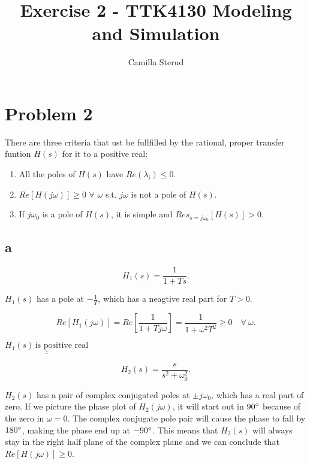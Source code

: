 \documentclass{article}
\title{Exercise 2 - TTK4130 Modeling and Simulation}
\author{Camilla Sterud}
\date{}
\begin{document}
\maketitle

\newpage

\section*{Problem 2}

There are three criteria that ust be fullfilled by the rational, proper transfer funtion $H(s)$ for it to  a positive real:

\begin{enumerate}
\item All the poles of $H(s)$ have $Re(\lambda_i) \leq 0$.
\item \label{crit:two} $Re[H(j\omega)] \geq 0$ $\forall$  $\omega$ s.t. $j\omega$ is not a pole of $H(s)$.
\item If $j\omega_0$ is a pole of $H(s)$, it is simple and $Res_{s = j\omega_0}[H(s)] > 0$.
\end{enumerate}


\subsection*{a}

\begin{equation*}
	H_1(s) = \frac{1}{1 + Ts}.
\end{equation*}

$H_1(s)$ has a pole at $-\frac{1}{T}$, which has a neagtive real part for $T > 0$.

\begin{equation*}
    Re[H_1(j\omega)] = Re[\frac{1}{1 + Tj\omega}] = \frac{1}{1 + \omega^2T^2} \geq 0 \quad \forall \: \omega.
\end{equation*}

$\underline{\underline{H_1(s) \, \textrm{is positive real}}}$

\begin{equation*}
    H_2(s) = \frac{s}{s^2 + \omega_0^2}.
\end{equation*}

$H_2(s)$ has a pair of complex conjugated poles at $\pm j\omega_0$, which has a real part of zero. If we picture the phase plot of $H_2(j\omega)$, it will start out in $90\degree$ because of the zero in $\omega = 0$. The complex conjugate pole pair will cause the phase to fall by $180\degree$, making the phase end up at $-90\degree$. This means that $H_2(s)$ will always stay in the right half plane of the complex plane and we can conclude that $Re[H(j\omega)] \geq 0$.
\end{document}
